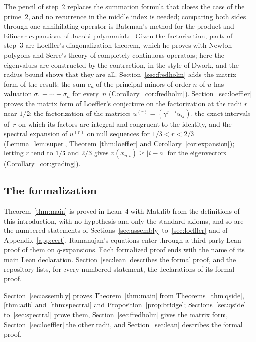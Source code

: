\documentclass[11pt]{amsart}
\theoremstyle{definition}
\numberwithin{equation}{section}
\newcommand{\sig}{\sigma}
\begin{document}
The pencil of step~2 replaces the summation formula that closes the case of the prime~$2$, and no recurrence in the middle index is needed; comparing both sides through one annihilating operator is Bateman's method for the product and bilinear expansions of Jacobi polynomials \cite[\S2]{Koo74}. Given the factorization, parts of step~3 are Loeffler's diagonalization theorem, which he proves with Newton polygons and Serre's theory of completely continuous operators; here the eigenvalues are constructed by the contraction, in the style of Dwork, and the radius bound shows that they are all. Section~\ref{sec:fredholm} adds the matrix form of the result: the sum $c_n$ of the principal minors of order $n$ of $u$ has valuation $\sig_1+\cdots+\sig_n$ for every~$n$ (Corollary~\ref{cor:fredholm}). Section~\ref{sec:loeffler} proves the matrix form of Loeffler's conjecture on the factorization at the radii $r$ near $1/2$: the factorization of the matrices $u^{(r)}=(\gamma^{j-i}u_{ij})$, the exact intervals of~$r$ on which its factors are integral and congruent to the identity, and the spectral expansion of $u^{(r)}$ on null sequences for $1/3<r<2/3$ (Lemma~\ref{lem:super}, Theorem~\ref{thm:loeffler} and Corollary~\ref{cor:expansion}); letting $r$ tend to $1/3$ and $2/3$ gives $v(x_{n,i})\ge|i-n|$ for the eigenvectors (Corollary~\ref{cor:grading}).

\subsection*{The formalization}
Theorem~\ref{thm:main} is proved in Lean~4 with Mathlib from the definitions of this introduction, with no hypothesis and only the standard axioms, and so are the numbered statements of Sections~\ref{sec:assembly} to~\ref{sec:loeffler} and of Appendix~\ref{app:cert}. Ramanujan's equations enter through a third-party Lean proof of them on $q$-expansions. Each formalized proof ends with the name of its main Lean declaration. Section~\ref{sec:lean} describes the formal proof, and the repository lists, for every numbered statement, the declarations of its formal proof.

Section~\ref{sec:assembly} proves Theorem~\ref{thm:main} from Theorems~\ref{thm:qside}, \ref{thm:adb} and~\ref{thm:spectral} and Proposition~\ref{prop:bridge}; Sections~\ref{sec:qside} to~\ref{sec:spectral} prove them, Section~\ref{sec:fredholm} gives the matrix form, Section~\ref{sec:loeffler} the other radii, and Section~\ref{sec:lean} describes the formal proof.
\end{document}
